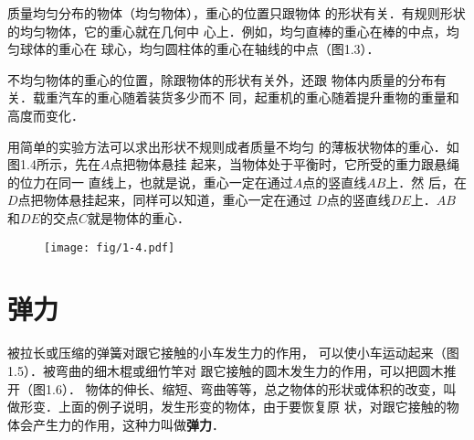     质量均匀分布的物体（均匀物体），重心的位置只跟物体
的形状有关．有规则形状的均匀物体，它的重心就在几何中
心上．例如，均匀直棒的重心在棒的中点，均匀球体的重心在
球心，均匀圆柱体的重心在轴线的中点（图1.3）．

 \begin{figure}[htp]\centering
{}
\caption{}
 \end{figure}

    不均匀物体的重心的位置，除跟物体的形状有关外，还跟
物体内质量的分布有关．载重汽车的重心随着装货多少而不
同，起重机的重心随着提升重物的重量和高度而变化．

    用简单的实验方法可以求出形状不规则成者质量不均匀
的薄板状物体的重心．如图1.4所示，先在$A$点把物体悬挂
起来，当物体处于平衡时，它所受的重力跟悬绳的位力在同一
直线上，也就是说，重心一定在通过$A$点的竖直线$AB$上．然
后，在$D$点把物体悬挂起来，同样可以知道，重心一定在通过
$D$点的竖直线$DE$上．$AB$和$DE$的交点$C$就是物体的重心．


\begin{figure}[htp]
\centering
\texttt{[image: fig/1-4.pdf]}
\caption{}
\end{figure}

\section{弹力}
被拉长或压缩的弹簧对跟它接触的小车发生力的作用，
可以使小车运动起来（图1.5）．被弯曲的细木棍或细竹竿对
跟它接触的圆木发生力的作用，可以把圆木推开（图1.6）．
物体的伸长、缩短、弯曲等等，总之物体的形状或体积的改变，叫
做形变．上面的例子说明，发生形变的物体，由于要恢复原
状，对跟它接触的物体会产生力的作用，这种力叫做\textbf{弹力}．


